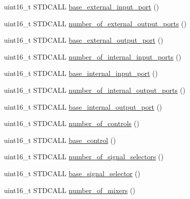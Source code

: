 \begin{DoxyCompactItemize}
\item 
uint16\+\_\+t S\+T\+D\+C\+A\+LL \hyperlink{classavdecc__lib_1_1audio__unit__descriptor__response__imp_ab03cb6c392c393e20664a064a7328bf9}{base\+\_\+external\+\_\+input\+\_\+port} ()
\item 
uint16\+\_\+t S\+T\+D\+C\+A\+LL \hyperlink{classavdecc__lib_1_1audio__unit__descriptor__response__imp_a0d8882e8009f2a604230b22f90c01782}{number\+\_\+of\+\_\+external\+\_\+output\+\_\+ports} ()
\item 
uint16\+\_\+t S\+T\+D\+C\+A\+LL \hyperlink{classavdecc__lib_1_1audio__unit__descriptor__response__imp_afce0a122e123f2578ba5b74ed26c4b6f}{base\+\_\+external\+\_\+output\+\_\+port} ()
\item 
uint16\+\_\+t S\+T\+D\+C\+A\+LL \hyperlink{classavdecc__lib_1_1audio__unit__descriptor__response__imp_af0e8979fdc248d11896c594579d139a3}{number\+\_\+of\+\_\+internal\+\_\+input\+\_\+ports} ()
\item 
uint16\+\_\+t S\+T\+D\+C\+A\+LL \hyperlink{classavdecc__lib_1_1audio__unit__descriptor__response__imp_a0d5c3c8923ec1ae63c00adfe3d263d79}{base\+\_\+internal\+\_\+input\+\_\+port} ()
\item 
uint16\+\_\+t S\+T\+D\+C\+A\+LL \hyperlink{classavdecc__lib_1_1audio__unit__descriptor__response__imp_a12f0cd17336db3e0a7350016613bf1d8}{number\+\_\+of\+\_\+internal\+\_\+output\+\_\+ports} ()
\item 
uint16\+\_\+t S\+T\+D\+C\+A\+LL \hyperlink{classavdecc__lib_1_1audio__unit__descriptor__response__imp_af3ea4253c181bfe0896545253eccf66e}{base\+\_\+internal\+\_\+output\+\_\+port} ()
\item 
uint16\+\_\+t S\+T\+D\+C\+A\+LL \hyperlink{classavdecc__lib_1_1audio__unit__descriptor__response__imp_abdf54b1d2b03f5f2b7346ddc9d93df5c}{number\+\_\+of\+\_\+controls} ()
\item 
uint16\+\_\+t S\+T\+D\+C\+A\+LL \hyperlink{classavdecc__lib_1_1audio__unit__descriptor__response__imp_a81a06cae8ad2431f6a3e067cc210aa98}{base\+\_\+control} ()
\item 
uint16\+\_\+t S\+T\+D\+C\+A\+LL \hyperlink{classavdecc__lib_1_1audio__unit__descriptor__response__imp_aeba614632454689712cd80e1dca000de}{number\+\_\+of\+\_\+signal\+\_\+selectors} ()
\item 
uint16\+\_\+t S\+T\+D\+C\+A\+LL \hyperlink{classavdecc__lib_1_1audio__unit__descriptor__response__imp_ad5ba1884e440a00555d8c5a5d79085cd}{base\+\_\+signal\+\_\+selector} ()
\item 
uint16\+\_\+t S\+T\+D\+C\+A\+LL \hyperlink{classavdecc__lib_1_1audio__unit__descriptor__response__imp_ae34a26da5072da503102d8977a44dbc6}{number\+\_\+of\+\_\+mixers} ()

\end{DoxyCompactItemize}
